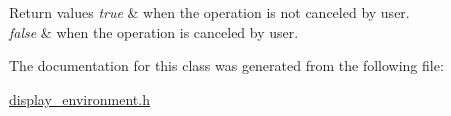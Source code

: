 \begin{DoxyRetVals}{Return values}
{\em true} & when the operation is not canceled by user. \\
\hline
{\em false} & when the operation is canceled by user. \\
\hline
\end{DoxyRetVals}


The documentation for this class was generated from the following file\-:\begin{DoxyCompactItemize}
\item 
\hyperlink{display__environment_8h}{display\-\_\-environment.\-h}\end{DoxyCompactItemize}
